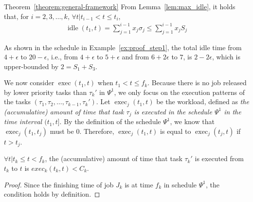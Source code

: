 \begin{appProof}{Theorem~\ref{theorem:general-framework}}
From Lemma~\ref{lem:max_idle}, it holds that, for $i=2,3,\ldots,k$, $\forall t | t_{i-1} < t \leq t_i$, 
\begin{align}
\label{eq:sumof-sigma}
\operatorname{idle}(t_1, t) = \sum_{j=1}^{i-1} x_j \sigma_j \leq
  \sum_{j=1}^{i-1} x_j S_j
\end{align}

As shown in the schedule in Example~\ref{ex:proof_step1}, the total idle time from $4+\epsilon$ to
$20-\epsilon$, i.e., from $4+\epsilon$ to $5+\epsilon$ and from
$6+2\epsilon$ to $7$, is $2-2\epsilon$, which is upper-bounded by $2 =
S_1+S_3$. 


%


We now consider $\operatorname{exec}(t_1, t)$ when $t_1 < t \leq f_k$.
Because there is no job released by lower priority tasks than
$\tau_k'$ in $\Psi^1$, we only focus on the execution patterns of the
tasks $(\tau_1, \tau_2, \ldots, \tau_{k-1}, \tau_k')$. Let
$\operatorname{exec}_j(t_1, t)$ be the workload, defined as \emph{the
 (accumulative) amount of time that task $\tau_j$ is executed in the schedule
  $\Psi^1$ in the time interval $(t_1, t]$}. By the definition of the
schedule $\Psi^1$, we know that $\operatorname{exec}_j(t_1, t_j)$ must
be $0$. Therefore, $\operatorname{exec}_j(t_1, t)$ is equal to
$\operatorname{exec}_j(t_j, t)$ if $t > t_j$.

\begin{Lemma}
  \label{lemma:exec-tau-k}
  $\forall t | t_k \leq t < f_k$, the (accumulative) amount of time that
  task $\tau_k'$ is executed from $t_k$ to $t$ is $exec_k(t_k, t) <
  C_k$.
\end{Lemma}
\begin{proof}
  Since the finishing time of job $J_k$ is at time $f_k$ in schedule $\Psi^1$, the
  condition holds by definition.
\end{proof}


\end{appProof}
